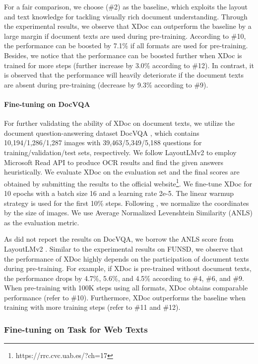 \documentclass[11pt]{article}
\begin{document}
For a fair comparison, we choose  (\#2) \cite{xu2020layoutlm} as the baseline, which exploits the layout and text knowledge for tackling visually rich document understanding. Through the experimental results, we observe that XDoc can outperform the baseline by a large margin if document texts are used during pre-training. According to \#10, the performance can be boosted by 7.1\% if all formats are used for pre-training. Besides, we notice that the performance can be boosted further when XDoc is trained for more steps (further increase by 3.0\% according to \#12). In contrast, it is observed that the performance will heavily deteriorate if the document texts are absent during pre-training (decrease by 9.3\% according to \#9).

\paragraph{Fine-tuning on DocVQA}
For further validating the ability of XDoc on document texts, we utilize the document question-answering dataset DocVQA \cite{mathew2021docvqa}, which contains 10,194/1,286/1,287 images with 39,463/5,349/5,188 questions for training/validation/test sets, respectively. We follow LayoutLMv2 \cite{xu2020layoutlmv2} to employ Microsoft Read API to produce OCR results and find the given answers heuristically. We evaluate XDoc on the evaluation set and the final scores are obtained by submitting the results to the official website\footnote{https://rrc.cvc.uab.es/?ch=17}. We fine-tune XDoc for 10 epochs with a batch size 16 and a learning rate 2e-5. The linear warmup strategy is used for the first 10\% steps. Following \cite{xu2020layoutlm}, we normalize the coordinates by the size of images. We use Average Normalized Levenshtein Similarity (ANLS) as the evaluation metric.

As  \cite{xu2020layoutlm} did not report the results on DocVQA, we borrow the ANLS score from LayoutLMv2 \cite{xu2020layoutlmv2}. Similar to the experimental results on FUNSD, we observe that the performance of XDoc highly depends on the participation of document texts during pre-training. For example, if XDoc is pre-trained without document texts, the performance drops by 4.7\%, 5.6\%, and 4.5\% according to \#4, \#6, and \#9. When pre-training with 100K steps using all formats, XDoc obtains comparable performance (refer to \#10). Furthermore, XDoc outperforms the baseline when training with more training steps (refer to \#11 and \#12).

\subsubsection{Fine-tuning on Task for Web Texts}
\end{document}
